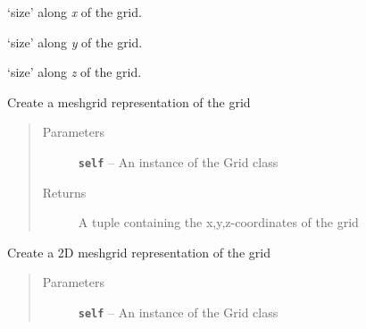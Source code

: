 \documentclass[letterpaper,10pt,english]{sphinxmanual}
\begin{document}
\begin{fulllineitems}

\begin{fulllineitems}
\label{hyvr:hyvr.hyvr.grid.Grid.lx}
`size' along \emph{x} of the grid.

\end{fulllineitems}


\begin{fulllineitems}
\label{hyvr:hyvr.hyvr.grid.Grid.ly}
`size' along \emph{y} of the grid.

\end{fulllineitems}


\begin{fulllineitems}
\label{hyvr:hyvr.hyvr.grid.Grid.lz}
`size' along \emph{z} of the grid.

\end{fulllineitems}


\begin{fulllineitems}
\label{hyvr:hyvr.hyvr.grid.Grid.meshup}
Create a meshgrid representation of the grid
\begin{quote}\begin{description}
\item[{Parameters}] \leavevmode
\textbf{\texttt{self}} -- An instance of the Grid class

\item[{Returns}] \leavevmode
A tuple containing the x,y,z-coordinates of the grid

\end{description}\end{quote}

\end{fulllineitems}


\begin{fulllineitems}
\label{hyvr:hyvr.hyvr.grid.Grid.meshup2d}
Create a 2D meshgrid representation of the grid
\begin{quote}\begin{description}
\item[{Parameters}] \leavevmode
\textbf{\texttt{self}} -- An instance of the Grid class


\end{description}
\end{quote}
\end{fulllineitems}
\end{fulllineitems}
\end{document}
